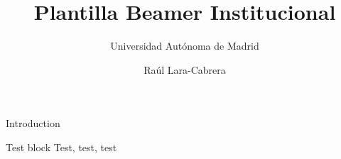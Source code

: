 \documentclass[pdflatex,compress]{beamer}
\title{Plantilla Beamer Institucional}
\subtitle{Universidad Aut\'{o}noma de Madrid}
\author{Ra\'{u}l Lara-Cabrera}
\begin{document}
\maketitle

\begin{frame}{Introduction}
  \lipsum[1]
\end{frame}

\begin{frame}
  \begin{block}{Test block}
    Test, test, test
  \end{block}
\end{frame}
\end{document}
